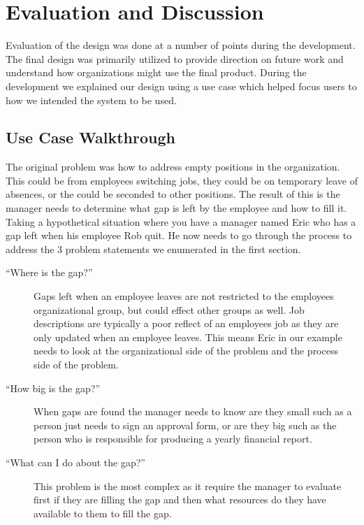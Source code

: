 \documentclass[journal]{vgtc}                %
\begin{document}
\section{Evaluation and Discussion}
\label{sec:evaldiscuss}

Evaluation of the design was done at a number of points during the development.  The final design was primarily utilized to provide direction on future work and understand how organizations might use the final product.  During the development we explained our design using a use case which helped focus users to how we intended the system to be used.

\subsection{Use Case Walkthrough}
The original problem was how to address empty positions in the organization.  This could be from employees switching jobs, they could be on temporary leave of absences, or the could be seconded to other positions.  The result of this is the manager needs to determine what gap is left by the employee and how to fill it.  Taking a hypothetical situation where you have a manager named Eric who has a gap left when his employee Rob quit.  He now needs to go through the process to address the 3 problem statements we enumerated in the first section.

\begin{description}
	\item [``Where is the gap?''] Gaps left when an employee leaves are not restricted to the employees organizational group, but could effect other groups as well.  Job descriptions are typically a poor reflect of an employees job as they are only updated when an employee leaves.  This means Eric in our example needs to look at the organizational side of the problem and the process side of the problem.
	\item [``How big is the gap?''] When gaps are found the manager needs to know are they small such as a person just needs to sign an approval form, or are they big such as the person who is responsible for producing a yearly financial report.

	\item [``What can I do about the gap?''] This problem is the most complex as it require the manager to evaluate first if they are filling the gap and then what resources do they have available to them to fill the gap.
\end{description}
\end{document}
